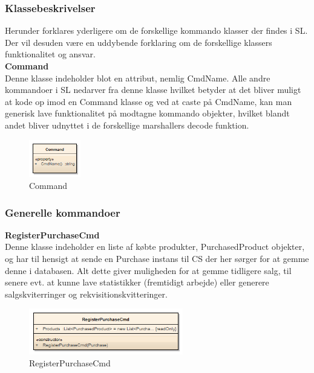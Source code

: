 \subsubsection{Klassebeskrivelser}
Herunder forklares yderligere om de forskellige kommando klasser der findes i \gls{SL}. Der vil desuden være en uddybende forklaring om de forskellige klassers funktionalitet og ansvar.\\

\textbf{Command}\\
Denne klasse indeholder blot en attribut, nemlig CmdName. Alle andre kommandoer i \gls{SL} nedarver fra denne klasse hvilket betyder at det bliver muligt at kode op imod en Command klasse og ved at caste på CmdName, kan man generisk lave funktionalitet på modtagne kommando objekter, hvilket blandt andet bliver udnyttet i de forskellige marshallers decode funktion.

\begin{figure}[H]
    \centering
    \includegraphics[width=0.2\textwidth]{Systemdesign/SharedLib/Images/Klasser/Command/Command.png}
    \caption{Command}
    \label{fig:klasseCMDCommand}
\end{figure}

\subsubsection*{Generelle kommandoer}

\textbf{RegisterPurchaseCmd}\\
Denne klasse indeholder en liste af købte produkter, PurchasedProduct objekter, og har til hensigt at sende en Purchase instans til \gls{CS} der her sørger for at gemme denne i databasen. Alt dette giver muligheden for at gemme tidligere salg, til senere evt. at kunne lave statistikker (fremtidigt arbejde) eller generere salgskviterringer og rekvisitionskvitteringer.

\begin{figure}[H]
    \centering
    \includegraphics[width=0.6\textwidth]{Systemdesign/SharedLib/Images/Klasser/Command/RegisterPurchase.png}
    \caption{RegisterPurchaseCmd}
    \label{fig:klasseCMDRegP}
\end{figure}

